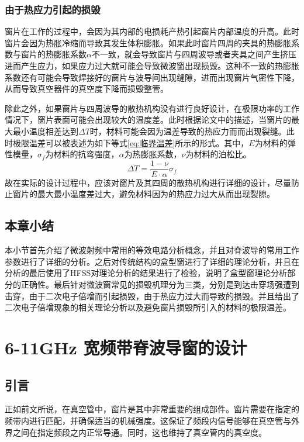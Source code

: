 \documentclass[master]{thesis-uestc}
\begin{document}
\subsection{由于热应力引起的损毁}
窗片在工作的过程中，会因为其内部的电损耗产热引起窗片内部温度的升高。此时窗片会因为热胀冷缩而导致其发生体积膨胀。如果此时窗片四周的夹具的热膨胀系数与窗片的热膨胀系数\(\alpha\)不一致，就会导致窗片与四周波导或者夹具之间产生挤压进而产生应力，如果应力过大就可能会导致微波窗出现损毁。这种不一致的热膨胀系数还有可能会导致焊接好的窗片与波导间出现缝隙，进而出现窗片气密性下降，从而导致真空器件的真空度下降而损毁整管。

除此之外，如果窗片与四周波导的散热机构没有进行良好设计，在极限功率的工作情况下，窗片表面可能会出现较大的温度差。此时根据论文\cite{lishengming_window_2017}中的描述，当窗片的最大最小温度相差达到\(\Delta T\)时，材料可能会因为温差导致的热应力而而出现裂缝。此时极限温差可以被表述为如下等式\ref{eq:临界温差}所示的形式。其中，\(E\)为材料的弹性模量，\(\sigma_f\)为材料的抗弯强度，\(\alpha\)为热膨胀系数，\(\nu\)为材料的泊松比。
\begin{equation}\label{eq:临界温差}
    \Delta T = \frac{1 - \nu}{E \cdot \alpha} \sigma_f
\end{equation}
故在实际的设计过程中，应该对窗片及其四周的散热机构进行详细的设计，尽量防止窗片的最大最小温度差过大，避免材料因为的热应力过大从而出现裂隙。

\section{本章小结}
本小节首先介绍了微波射频中常用的等效电路分析概念，并且对脊波导的常用工作参数进行了详细的分析。之后对传统结构的盒型窗进行了详细的理论分析，并且在分析的最后使用了HFSS对理论分析的结果进行了检验，说明了盒型窗理论分析部分的正确性。最后针对微波窗常见的损毁机理分为三类，分别是到达击穿场强遭到击穿，由于二次电子倍增而引起损毁，由于热应力过大而导致的损毁。并且给出了二次电子倍增现象的相关理论分析以及避免窗片损毁所引入的材料的极限温差。

\chapter{6-11GHz 宽频带脊波导窗的设计}
\section{引言}
正如前文所说，在真空管中，窗片是其中非常重要的组成部件。窗片需要在指定的频带内进行匹配，并确保适当的机械强度。这保证了频段内信号能够在真空管与外界之间在指定频段之内正常导通。同时，这也维持了真空管内的真空度。
\end{document}

